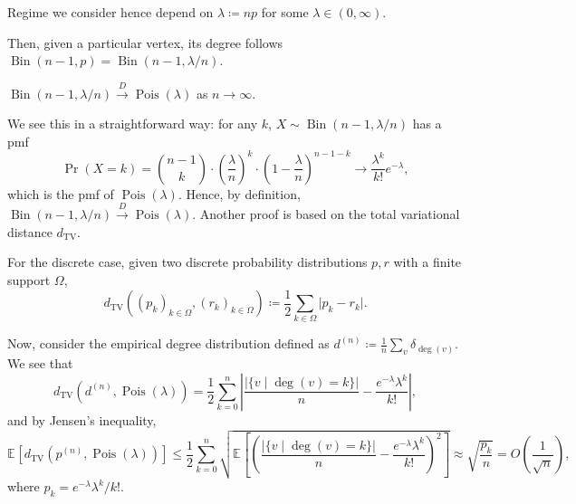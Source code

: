 \begin{note}
	Regime we consider hence depend on \(\lambda \coloneqq np\) for some \(\lambda \in (0, \infty )\).
\end{note}

Then, given a particular vertex, its degree follows \(\operatorname{Bin}(n-1, p) = \operatorname{Bin}(n-1, \lambda / n) \).

\begin{claim}
	\(\operatorname{Bin}(n-1, \lambda / n) \overset{D}{\to} \operatorname{Pois}(\lambda ) \) as \(n \to \infty \).
\end{claim}
\begin{explanation}
	We see this in a straightforward way: for any \(k\), \(X \sim \operatorname{Bin}(n-1, \lambda / n) \) has a pmf
	\[
		\Pr_{}(X = k)
		= \binom{n-1}{k} \cdot \left( \frac{\lambda}{n} \right) ^{k} \cdot \left( 1 - \frac{\lambda}{n} \right) ^{n-1-k}
		\to \frac{\lambda ^k}{k!} e^{-\lambda },
	\]
	which is the pmf of \(\operatorname{Pois}(\lambda ) \). Hence, by definition, \(\operatorname{Bin}(n - 1, \lambda / n) \overset{D}{\to} \operatorname{Pois}(\lambda ) \). Another proof is based on the total variational distance \(d_{\mathrm{TV} }\).

	\begin{prev}
		For the discrete case, given two discrete probability distributions \(p, r\) with a finite support \(\Omega \),
		\[
			d_{\mathrm{TV} }((p_k)_{k \in \Omega }, (r_k)_{k \in \Omega })
			\coloneqq \frac{1}{2} \sum_{k \in \Omega } \lvert p_k - r_k \rvert.
		\]
	\end{prev}

	Now, consider the empirical degree distribution defined as \(d^{(n)} \coloneqq \frac{1}{n} \sum_{v} \delta _{\deg(v)}\). We see that
	\[
		d_{\mathrm{TV} } \left( d^{(n)} , \operatorname{Pois}(\lambda ) \right)
		= \frac{1}{2} \sum_{k=0}^{n} \left\lvert \frac{\lvert \{ v \mid \deg(v) = k \}  \rvert }{n} - \frac{e^{-\lambda } \lambda ^k}{k!} \right\rvert ,
	\]
	and by Jensen's inequality,
	\[
		\mathbb{E}_{}\left[d_{\mathrm{TV} } \left( p^{(n)} , \operatorname{Pois}(\lambda ) \right) \right]
		\leq \frac{1}{2} \sum_{k=0}^{n} \sqrt{ \mathbb{E}_{}\left[ \left( \frac{\lvert \{ v \mid \deg(v) = k \}  \rvert }{n} - \frac{e^{-\lambda } \lambda ^k}{k!} \right) ^2 \right] }
		\approx \sqrt{\frac{p_k}{n}}
		= O\left( \frac{1}{\sqrt{n} } \right) ,
	\]
	where \(p_k = e^{-\lambda } \lambda ^k / k!\).
\end{explanation}

